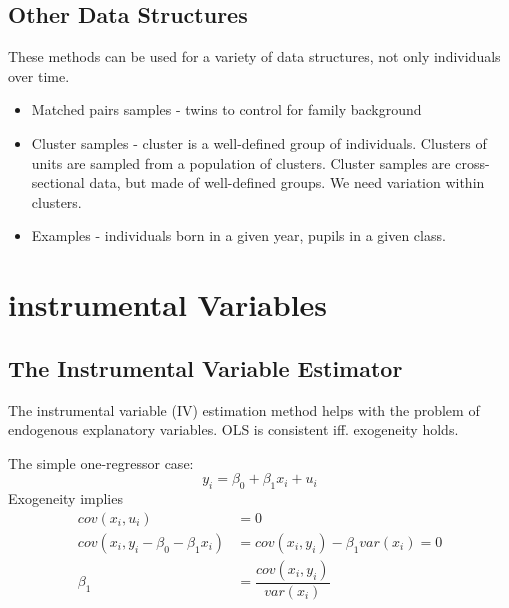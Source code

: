 \documentclass[11pt]{article}
\begin{document}
 \subsection{Other Data Structures}

 These methods can be used for a variety of data structures, not only individuals over time.

 \begin{itemize}
     \item Matched pairs samples - twins to control for family background
     \item Cluster samples - cluster is a well-defined group of individuals. Clusters of units are sampled from a population of clusters. Cluster samples are cross-sectional data, but made of well-defined groups. We need variation within clusters. 

    \item Examples - individuals born in a given year, pupils in a given class.
 \end{itemize}


\section{instrumental Variables}

\subsection{The Instrumental Variable Estimator}

The instrumental variable (IV) estimation method helps with the problem of endogenous explanatory variables. OLS is consistent iff. exogeneity holds.
\begin{example}
    The simple one-regressor case:
    \[y_i = \beta_0 + \beta_1 x_i + u_i\]
    Exogeneity implies
    \begin{align*}
        cov(x_i,u_i)&=0 \\
        cov(x_i, y_i - \beta_0 - \beta_1 x_i) &= cov(x_i, y_i) - \beta_1 var(x_i) = 0 \\
        \beta_1 &= \dfrac{cov(x_i,y_i)}{var(x_i)}
    \end{align*}
\end{example}
\end{document}
